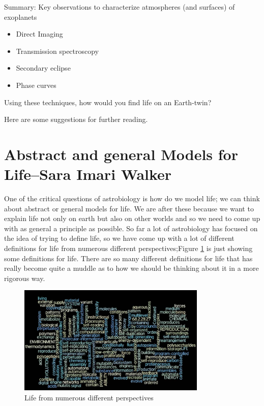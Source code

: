 \documentclass[]{article}
\begin{document}
Summary: Key observations to characterize atmospheres (and surfaces) of exoplanets
\begin{itemize}
	\item Direct Imaging
	\item  Transmission spectroscopy
	\item  Secondary eclipse
	\item  Phase curves
\end{itemize}
Using these techniques, how would you find life on an Earth-twin?


Here are some suggestions for further reading.

\cite{fujii2018exoplanet,sagan1993search,kaltenegger2017characterize,robinson2011earth,deming2013infrared,knutson2007map}

\section[Abstract and general Models for Life]{Abstract and general Models for Life--Sara Imari Walker}

One of the critical questions of
astrobiology is how do we model life;
we can think about abstract or general
models for life. We are
after these because we want to  explain life not
only on earth but also on other
worlds and so we need to come up with as
general a principle as possible. So far a
lot of astrobiology has focused on the
idea of trying to define life, so we have
come up with a lot of different
definitions for life
from numerous different perspectives;Figure \ref{fig:life-word-cloud} is just showing some definitions for life. There are so
many different definitions for life that
has really become quite a muddle as to
how we should be thinking about it in a
more rigorous way.

\begin{figure}[H]
	\begin{center}
		\caption[Life from numerous different perspectives]{Life from numerous different perspectives\cite{trifonov2011vocabulary}}\label{fig:life-word-cloud}
		\includegraphics[width=0.8\textwidth]{life-word-cloud}
	\end{center}
\end{figure}
\end{document}
